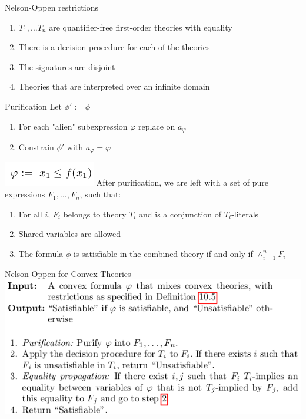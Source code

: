 \documentclass{beamer}
\begin{document}
\begin{frame}{Nelson-Oppen restrictions}
\begin{enumerate}
\item $T_1, \dots T_n$ are quantifier-free first-order theories with equality
\item There is a decision procedure for each of the theories
\item The signatures are disjoint
\item Theories that are interpreted over an infinite domain
\end{enumerate}
\end{frame}

\begin{frame}{Purification}
Let $\phi' := \phi$
\begin{enumerate}
\item For each "alien" subexpression $\varphi$ replace on $a_{\varphi}$
\item Constrain $\phi'$ with  $a_{\varphi} = \varphi$
\end{enumerate}
\includegraphics[scale=0.5]{ex1.png}\newline
After purification, we are left with a set of pure expressions $F_1, \dots, F_n$, such that:
\begin{enumerate}
\item For all $i$, $F_i$ belongs to theory $T_i$ and is a conjunction of $T_i$-literals
\item Shared variables are allowed
\item The formula $\phi$ is satisfiable in the combined theory if and only if $\wedge_{i=1}^{n}F_i$
\end{enumerate}
\end{frame}

\begin{frame}{Nelson-Oppen for Convex Theories}
\includegraphics[scale=0.5]{Nelson-Oppen-for-Convex-Theories.png}\newline
\end{frame}
\end{document}

